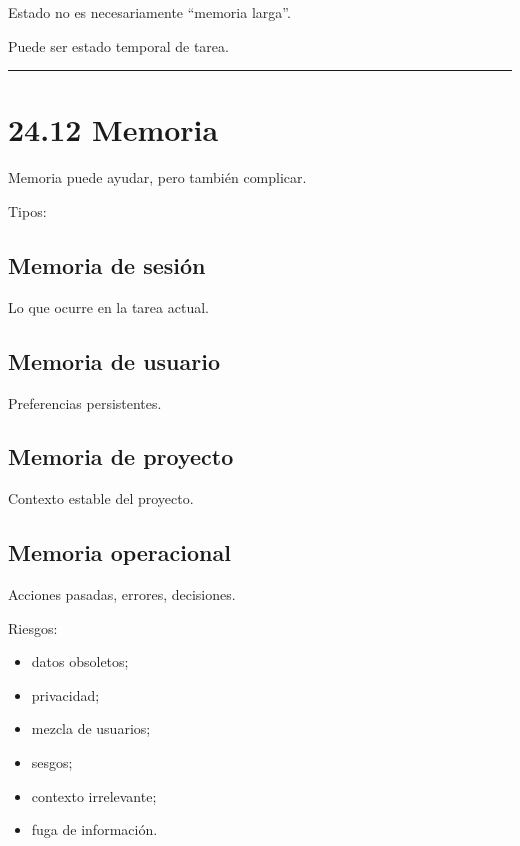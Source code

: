 Estado no es necesariamente ``memoria larga''.

Puede ser estado temporal de tarea.

\begin{center}\rule{0.5\linewidth}{0.5pt}\end{center}

\section{24.12 Memoria}\label{memoria-3}

Memoria puede ayudar, pero también complicar.

Tipos:

\subsection{Memoria de sesión}\label{memoria-de-sesiuxf3n}

Lo que ocurre en la tarea actual.

\subsection{Memoria de usuario}\label{memoria-de-usuario-2}

Preferencias persistentes.

\subsection{Memoria de proyecto}\label{memoria-de-proyecto}

Contexto estable del proyecto.

\subsection{Memoria operacional}\label{memoria-operacional}

Acciones pasadas, errores, decisiones.

Riesgos:

\begin{itemize}
\tightlist
\item
  datos obsoletos;
\item
  privacidad;
\item
  mezcla de usuarios;
\item
  sesgos;
\item
  contexto irrelevante;
\item
  fuga de información.
\end{itemize}


